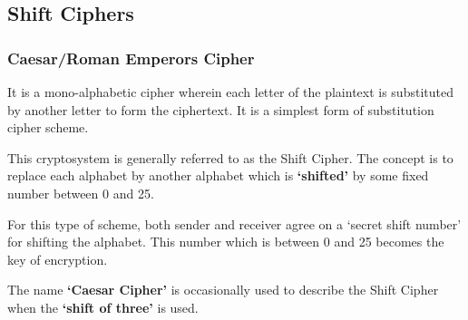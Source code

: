 \documentclass[british]{article}
\begin{document}
\subsection{Shift Ciphers}

\subsubsection{Caesar/Roman Emperors Cipher}

It is a mono-alphabetic cipher wherein each letter of the plaintext
is substituted by another letter to form the ciphertext. It is a simplest
form of substitution cipher scheme.

This cryptosystem is generally referred to as the Shift Cipher. The
concept is to replace each alphabet by another alphabet which is \textbf{`shifted'}
by some fixed number between 0 and 25.

For this type of scheme, both sender and receiver agree on a `secret
shift number' for shifting the alphabet. This number which is between
0 and 25 becomes the key of encryption.

The name \textbf{`Caesar Cipher'} is occasionally used to describe
the Shift Cipher when the \textbf{`shift of three'} is used.
\end{document}
